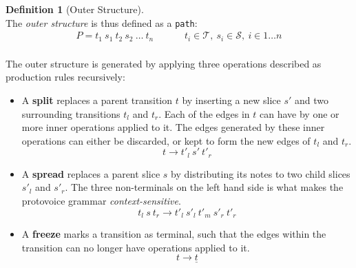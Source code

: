 \documentclass[12pt,a4paper,twoside,openright]{report}
\theoremstyle{definition}
\newtheorem{definition}{Definition}[section]
\begin{document}
\begin{definition}[Outer Structure] ~\\The \textit{outer structure} is thus defined as a \texttt{path}:
\begin{equation}
    \begin{aligned}
      P = t_1~s_1~t_2~s_2~\dots~t_n     &&&& t_i \in \mathcal{T},~s_i \in \mathcal{S},~ i \in 1\dots n \\
    \end{aligned}
  \label{eq:outerStructureDef}
\end{equation}
\end{definition}

The outer structure is generated by applying three operations described as production rules recursively:

\begin{itemize}
  \item A \textbf{split} replaces a parent transition $t$ by inserting a new slice $s'$ and two surrounding transitions $t_l$ and $t_r$. Each of the edges in $t$ can have by one or more inner operations applied to it. The edges generated by these inner operations can either be discarded, or kept to form the new edges of $t_l$ and $t_r$.
\begin{equation}
  t \to t'_l~s'~t'_r
  \label{eq:splitrule}
\end{equation}
\item A \textbf{spread} replaces a parent slice $s$ by distributing its notes to two child slices $s'_l$ and $s'_r$. 
  The three non-terminals on the left hand side is what makes the protovoice grammar \textit{context-sensitive}.
\begin{equation}
  t_l~s~t_r \to t'_l~s'_l~t'_m~s'_r~t'_r
  \label{eq:spreadrule}
\end{equation}
\item A \textbf{freeze} marks a transition as terminal, such that the edges within the transition can no longer have operations applied to it. 
\begin{equation}
  t \to \underline{t}
  \label{eq:freezerule}
\end{equation}
\end{itemize}
\end{document}
